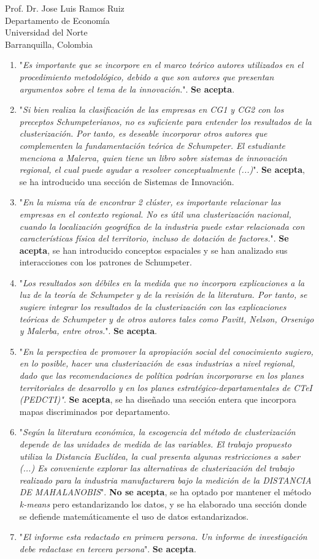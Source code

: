 \documentclass[11pt]{letter}
\begin{document}
\begin{letter}{ Prof. Dr. Jose Luis Ramos Ruiz \\
Departamento de Economía \\
Universidad del Norte \\
Barranquilla, Colombia}
\begin{enumerate}
	\item "\textit{Es importante que se incorpore en el marco teórico autores utilizados en el procedimiento metodológico, debido a que son autores que presentan argumentos sobre el tema de la innovación.}". \textbf{Se acepta}.
	\item "\textit{Si bien realiza la clasificación de las empresas en CG1 y CG2 con los preceptos Schumpeterianos, no es suficiente para entender los resultados de la clusterización. Por tanto, es deseable incorporar otros autores que complementen la fundamentación teórica de Schumpeter. El estudiante menciona a Malerva, quien tiene un libro sobre sistemas de innovación regional, el cual puede ayudar a resolver conceptualmente (...)}".  \textbf{Se acepta}, se ha introducido una sección de Sistemas de Innovación.
	\item "\textit{En la misma vía de encontrar 2 clúster, es importante relacionar las empresas en el contexto regional. No es útil una clusterización nacional, cuando la localización geográfica de la industria puede estar relacionada con características física del territorio, incluso de dotación de factores.}". \textbf{Se acepta}, se han introducido conceptos espaciales y se han analizado sus interacciones  con los patrones de Schumpeter.
	\item "\textit{Los resultados son débiles en la medida que no incorpora explicaciones a la luz de la teoría de Schumpeter y de la revisión de la literatura. Por tanto, se sugiere integrar los resultados de la clusterización con las explicaciones teóricas de Schumpeter y de otros autores tales como Pavitt, Nelson, Orsenigo y Malerba, entre otros.}". \textbf{Se acepta}.
	\item "\textit{En la perspectiva de promover la apropiación social del conocimiento sugiero, en lo posible, hacer una clusterización de esas industrias a nivel regional, dado que las recomendaciones de política podrían incorporarse en los planes territoriales de desarrollo y en los planes estratégico-departamentales de CTeI (PEDCTI)"}. \textbf{Se acepta}, se ha diseñado una sección entera que incorpora mapas discriminados por departamento.
	\item "\textit{Según la literatura económica, la escogencia del método de clusterización depende de las unidades de medida de las variables. El trabajo propuesto utiliza la Distancia Euclídea, la cual presenta algunas restricciones a saber (...) Es conveniente explorar las alternativas de clusterización del trabajo realizado para la industria manufacturera bajo la medición de la DISTANCIA DE MAHALANOBIS}". \textbf{No se acepta}, se ha optado por mantener el método \textit{k-means} pero estandarizando los datos, y se ha elaborado una sección donde se defiende matemáticamente el uso de datos estandarizados.
	\item "\textit{El informe esta redactado en primera persona. Un informe de investigación debe redactase en tercera persona}". \textbf{Se acepta}.
\end{enumerate}


\end{letter}
\end{document}
